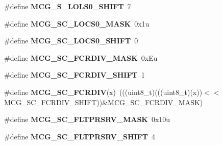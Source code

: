 \begin{DoxyCompactItemize}
\item 
\#define {\bfseries M\+C\+G\+\_\+\+S\+\_\+\+L\+O\+L\+S0\+\_\+\+S\+H\+I\+FT}~7\hypertarget{group__MCG__Register__Masks_ga5cddd795823b73d50830e628cee24644}{}\label{group__MCG__Register__Masks_ga5cddd795823b73d50830e628cee24644}

\item 
\#define {\bfseries M\+C\+G\+\_\+\+S\+C\+\_\+\+L\+O\+C\+S0\+\_\+\+M\+A\+SK}~0x1u\hypertarget{group__MCG__Register__Masks_ga9a57acb821c7622eb2b25e6c7daf7e16}{}\label{group__MCG__Register__Masks_ga9a57acb821c7622eb2b25e6c7daf7e16}

\item 
\#define {\bfseries M\+C\+G\+\_\+\+S\+C\+\_\+\+L\+O\+C\+S0\+\_\+\+S\+H\+I\+FT}~0\hypertarget{group__MCG__Register__Masks_ga2a80b0f354602d5da8426e9d2b51ea12}{}\label{group__MCG__Register__Masks_ga2a80b0f354602d5da8426e9d2b51ea12}

\item 
\#define {\bfseries M\+C\+G\+\_\+\+S\+C\+\_\+\+F\+C\+R\+D\+I\+V\+\_\+\+M\+A\+SK}~0x\+Eu\hypertarget{group__MCG__Register__Masks_ga9b5d58f2f0a68eabe93f088dc2f81d2b}{}\label{group__MCG__Register__Masks_ga9b5d58f2f0a68eabe93f088dc2f81d2b}

\item 
\#define {\bfseries M\+C\+G\+\_\+\+S\+C\+\_\+\+F\+C\+R\+D\+I\+V\+\_\+\+S\+H\+I\+FT}~1\hypertarget{group__MCG__Register__Masks_gacc99cc05a01e5807395bfe11518b26e3}{}\label{group__MCG__Register__Masks_gacc99cc05a01e5807395bfe11518b26e3}

\item 
\#define {\bfseries M\+C\+G\+\_\+\+S\+C\+\_\+\+F\+C\+R\+D\+IV}(x)~(((uint8\+\_\+t)(((uint8\+\_\+t)(x))$<$$<$M\+C\+G\+\_\+\+S\+C\+\_\+\+F\+C\+R\+D\+I\+V\+\_\+\+S\+H\+I\+FT))\&M\+C\+G\+\_\+\+S\+C\+\_\+\+F\+C\+R\+D\+I\+V\+\_\+\+M\+A\+SK)\hypertarget{group__MCG__Register__Masks_ga50a0225002267599fa7a2fc341fa783a}{}\label{group__MCG__Register__Masks_ga50a0225002267599fa7a2fc341fa783a}

\item 
\#define {\bfseries M\+C\+G\+\_\+\+S\+C\+\_\+\+F\+L\+T\+P\+R\+S\+R\+V\+\_\+\+M\+A\+SK}~0x10u\hypertarget{group__MCG__Register__Masks_ga1eea80f4646116c2ca2a68aa3469436a}{}\label{group__MCG__Register__Masks_ga1eea80f4646116c2ca2a68aa3469436a}

\item 
\#define {\bfseries M\+C\+G\+\_\+\+S\+C\+\_\+\+F\+L\+T\+P\+R\+S\+R\+V\+\_\+\+S\+H\+I\+FT}~4\hypertarget{group__MCG__Register__Masks_gac75a3cb915913ba4acc64a098bba4eb5}{}\label{group__MCG__Register__Masks_gac75a3cb915913ba4acc64a098bba4eb5}


\end{DoxyCompactItemize}
